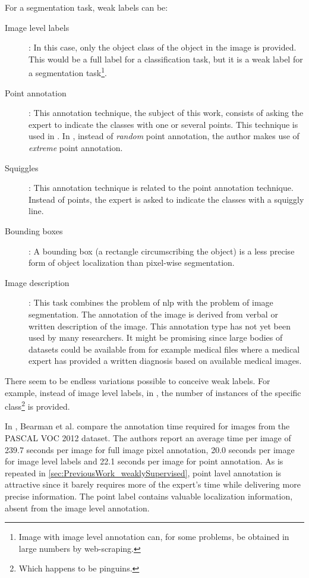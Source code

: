 For a segmentation task, weak labels can be:
\begin{description}
    \item[Image level labels]: In this case, only the object class of the object in the image is provided. 
    This would be a full label for a classification task, but it is a weak label for a segmentation task\footnote{Image with image level annotation can, for some problems, be obtained in large numbers by web-scraping.}.
    \item[Point annotation]: This annotation technique, the subject of this work, consists of asking the expert to indicate the classes with one or several points. This technique is used in \cite{Laradji2020, Laradji2018, McEver2020}.
    In \cite{Mainis}, instead of \textit{random} point annotation, the author makes use of \textit{extreme} point annotation.  
    \item[Squiggles]: This annotation technique is related to the point annotation technique. Instead of points, the expert is asked to indicate the classes with a squiggly line.
    \item[Bounding boxes]: A bounding box (a rectangle circumscribing the object) is a less precise form of object localization than pixel-wise segmentation.
    \item[Image description]: This task combines the problem of \acrlong{nlp} with the problem of image segmentation. The annotation of the image is derived from verbal or written description of the image. 
    This annotation type has not yet been used by many researchers. 
    It might be promising since large bodies of datasets could be available from for example medical files where a medical expert has provided a written diagnosis based on available medical images. 
\end{description}
\par{
    There seem to be endless variations possible to conceive weak labels. 
    For example, instead of image level labels, in \cite{Laradji2018}, the number of instances of the specific class\footnote{Which happens to be pinguins.} is provided. 
}
\par{
    In \cite{Bearman2015}, Bearman et al. compare the annotation time required for images from the PASCAL VOC 2012 dataset.
    The authors report an average time per image of 239.7 seconds per image for full image pixel annotation, 20.0 seconds per image for image level labels and 22.1 seconds per image for point annotation.
    As is repeated in \ref{sec:PreviousWork_weaklySupervised}, point lavel annotation is attractive since it barely requires more of the expert's time while delivering more precise information.
    The point label contains valuable localization information, absent from the image level annotation.
}
